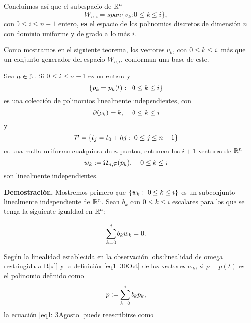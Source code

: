 Concluimos así que
el subespacio de $\mathbb{R}^{n}$
\begin{equation*}
\label{def de espacios Wk}
W_{n,i}= span\{ v_{k} : 0 \leq k \leq i \},
\end{equation*}
con $0 \leq i \leq n-1$ entero,
\textbf{es} el espacio de
los polinomios discretos
de dimensión $n$ con dominio uniforme 
y
de grado a lo más $i$.



Como mostramos en el siguiente teorema, los vectores
$v_{k}$, con $0 \leq k \leq i$, más que un conjunto generador
del espacio $W_{n,i}$, conforman una base de este.


\begin{prop} \label{Teorema1}
Sea $n \in \mathbb{N}$.
Si $0 \leq i \leq n-1$ es un entero y
\[
\{ p_{k}=p_{k}(t): \hspace{0.2cm} 0 \leq k \leq i \}
\]
es una colección de polinomios linealmente independientes, con
\[
\partial (p_{k})=k, \hspace{0.4cm} 0 \leq k \leq i
\]
y 
\[
\mathcal{P}= \{ t_{j}= t_{0}+hj :\hspace{0.1cm} 0 \leq j \leq n-1 \}
\]
es una malla uniforme cualquiera
de $n$ puntos, entonces los $i+1$ vectores
de $\mathbb{R}^{n}$
\begin{equation}
\label{eq1: 30Oct}
w_{k} := \Omega_{n, \mathcal{P}}(p_{k}), \hspace{0.4cm} 0 \leq k \leq i
\end{equation}
son linealmente independientes.
\end{prop}
\noindent
\textbf{Demostración.}
Mostremos primero que $\{ w_{k}: \hspace{0.1cm} 0 \leq k \leq i \}$
es un subconjunto linealmente independiente de $\mathbb{R}^{n}$.
Sean $b_{k}$ con $0 \leq k \leq i$ escalares
para los que se tenga la siguiente igualdad en $\mathbb{R}^{n}$:

\begin{equation} \label{eq1: 3Agosto}
\sum\limits_{k=0}^{i}b_{k}w_{k}=0.
\end{equation}

\noindent 
Según la linealidad establecida en la observación
\ref{obs:linealidad de omega restringida a R[x]}
y la definición \ref{eq1: 30Oct} de los vectores $w_{k}$,
si $p=p(t)$ es el polinomio
definido como
\begin{equation}
\label{eq2: 30Oct}
p:=\sum\limits_{k=0}^{i}b_{k}p_{k},
\end{equation}
la ecuación \eqref{eq1: 3Agosto} puede reescribirse como


